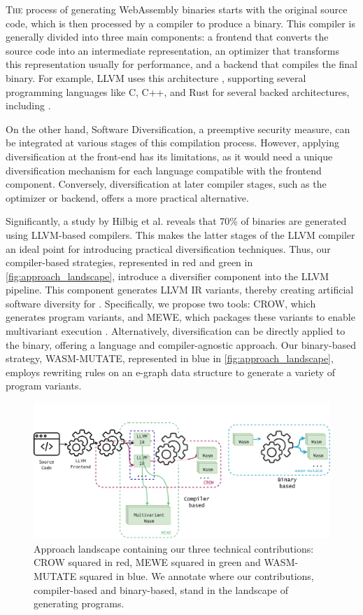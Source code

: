 
\lettrine[lines=4]{T}{he} process of generating WebAssembly binaries starts with the original source code, which is then processed by a compiler to produce a \Wasm binary. 
This compiler is generally divided into three main components: a frontend that converts the source code into an intermediate representation, an optimizer that transforms this representation usually for performance, and a backend that compiles the final \Wasm binary. 
For example, LLVM uses this architecture \cite{llvmofficialweb}, supporting several programming languages like C, C++, and Rust for several backed architectures, including \Wasm.


On the other hand, Software Diversification, a preemptive security measure, can be integrated at various stages of this compilation process. 
However, applying diversification at the front-end has its limitations, as it would need a unique diversification mechanism for each language compatible with the frontend component. 
Conversely, diversification at later compiler stages, such as the optimizer or backend, offers a more practical alternative.

Significantly, a study by Hilbig et al. reveals that 70\% of \Wasm binaries are generated using LLVM-based compilers. 
This makes the latter stages of the LLVM compiler an ideal point for introducing practical \wasm diversification techniques. 
Thus, our compiler-based strategies, represented in red and green in \autoref{fig:approach_landscape}, introduce a diversifier component into the LLVM pipeline. 
This component generates LLVM IR variants, thereby creating artificial software diversity for \Wasm. 
Specifically, we propose two tools: CROW, which generates \Wasm program variants, and MEWE, which packages these variants to enable multivariant execution \cite{cox06}.
Alternatively, diversification can be directly applied to the \Wasm binary, offering a language and compiler-agnostic approach. 
Our binary-based strategy, WASM-MUTATE, represented in blue in \autoref{fig:approach_landscape}, employs rewriting rules on an e-graph data structure to generate a variety of \Wasm program variants.



\begin{figure}[h]
	\centering
	\includegraphics[width=1.0\textwidth]{figures/landscape.pdf}
	\caption{Approach landscape containing our three technical contributions: CROW squared in red, MEWE squared in green and WASM-MUTATE squared in blue. We annotate where our contributions, compiler-based and binary-based, stand in the landscape of generating \Wasm programs.}
	\label{fig:approach_landscape}
\end{figure}


